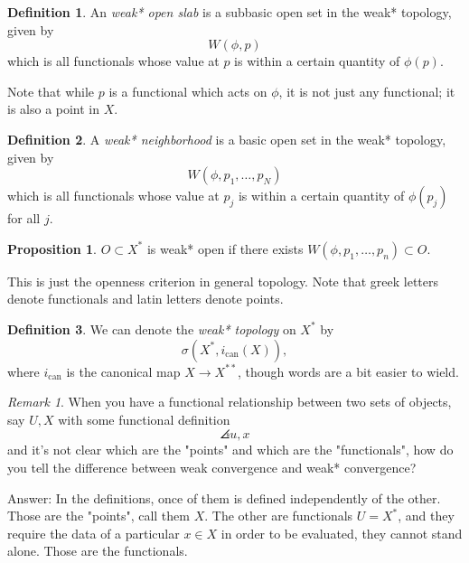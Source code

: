 \documentclass[a5paper]{article}
\theoremstyle{definition}%
\newtheorem*{proposition*}{Proposition}
\newtheorem*{definition*}{Definition}
\numberwithin{exercise}{section}
\theoremstyle{remark}%
\newtheorem*{remark*}{Remark}
\begin{document}
\begin{highlight}
\begin{definition*}
An \emph{weak* open slab} is a subbasic open set in the weak* topology, given by 
$$W(\phi, p)$$
which is all functionals whose value at $p$ is within a certain quantity of $\phi(p)$.
\end{definition*}
\end{highlight}
Note that while $p$ is a functional which acts on $\phi$, it is not just any functional; it is also a point in $X$. 

\begin{highlight}
\begin{definition*}
A \emph{weak* neighborhood} is a basic open set in the weak* topology, given by 
$$W(\phi,p_1, \dots, p_N)$$
which is all functionals whose value at $p_j$ is within a certain quantity of $\phi(p_j)$ for all $j$.  
\end{definition*}
\end{highlight}

\begin{highlight}
\begin{proposition*}
$O\subset X^*$ is weak* open if there exists $W(\phi,p_1, \dots, p_n)\subset O$. 
\end{proposition*}
\end{highlight}
This is just the openness criterion in general topology. Note that greek letters denote functionals and latin letters denote points. 

\begin{highlight}
\begin{definition*}
We can denote the \emph{weak* topology} on $X^*$ by 
$$\sigma(X^*, i_{\text{can}}(X)),$$
where $i_{\text{can}}$ is the canonical map $X\to X^{**}$, though words are a bit easier to wield. 
\end{definition*}
\end{highlight}

\begin{remark*}
When you have a functional relationship between two sets of objects, say $U,X$ with some functional definition 
$$\angles{u,x}$$
and it's not clear which are the "points" and which are the "functionals", how do you tell the difference between weak convergence and weak* convergence?

Answer: In the definitions, once of them is defined independently of the other. Those are the "points", call them $X$. The other are functionals $U=X^*$, and they require the data of a particular $x\in X$ in order to be evaluated, they cannot stand alone. Those are the functionals. 
\end{remark*}
\end{document}
